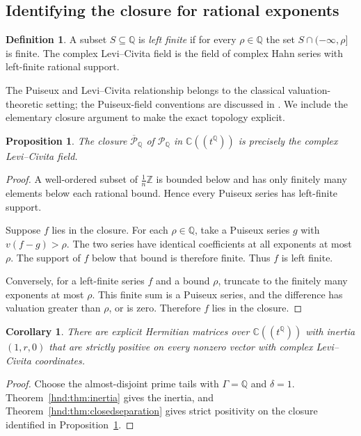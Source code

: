 \documentclass[11pt,oneside]{article}
\newtheorem{proposition}[theorem]{Proposition}
\newtheorem{corollary}[theorem]{Corollary}
\theoremstyle{definition}
\newtheorem{definition}[theorem]{Definition}
\theoremstyle{remark}
\newcommand{\C}{\mathbb C}
\newcommand{\Q}{\mathbb Q}
\newcommand{\Z}{\mathbb Z}
\begin{document}
\subsection{Identifying the closure for rational exponents}

\begin{definition}
A subset $S\subseteq\Q$ is \emph{left finite} if for every $\rho\in\Q$
the set $S\cap(-\infty,\rho]$ is finite. The complex Levi--Civita field
is the field of complex Hahn series with left-finite rational support.
\end{definition}

The Puiseux and Levi--Civita relationship belongs to the classical
valuation-theoretic setting; the Puiseux-field conventions are discussed
in \cite{dense-subfields}. We include the elementary closure argument to
make the exact topology explicit.

\begin{proposition}\label{hnd:prop:lc}
The closure $\overline{\mathscr P}_\Q$ of $\mathscr P_\Q$ in
$\C((t^\Q))$ is precisely the complex Levi--Civita field.
\end{proposition}
\begin{proof}
A well-ordered subset of $\frac1n\Z$ is bounded below and has only
finitely many elements below each rational bound. Hence every Puiseux
series has left-finite support.

Suppose $f$ lies in the closure. For each $\rho\in\Q$, take a Puiseux
series $g$ with $v(f-g)>\rho$. The two series have identical
coefficients at all exponents at most $\rho$. The support of $f$ below
that bound is therefore finite. Thus $f$ is left finite.

Conversely, for a left-finite series $f$ and a bound $\rho$, truncate to
the finitely many exponents at most $\rho$. This finite sum is a Puiseux
series, and the difference has valuation greater than $\rho$, or is
zero. Therefore $f$ lies in the closure.
\end{proof}

\begin{corollary}\label{hnd:cor:lc}
There are explicit Hermitian matrices over $\C((t^\Q))$ with inertia
$(1,r,0)$ that are strictly positive on every nonzero vector with
complex Levi--Civita coordinates.
\end{corollary}
\begin{proof}
Choose the almost-disjoint prime tails with $\Gamma=\Q$ and $\delta=1$.
Theorem~\ref{hnd:thm:inertia} gives the inertia, and
Theorem~\ref{hnd:thm:closedseparation} gives strict positivity on the
closure identified in Proposition~\ref{hnd:prop:lc}.
\end{proof}
\end{document}
